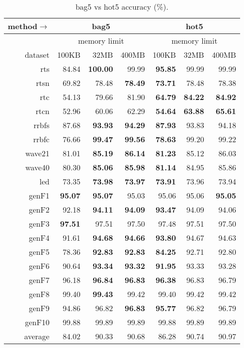 \begin{table}
\caption{{\sc bag5} vs {\sc hot5} accuracy (\%).}
\label{tab:bag5_vs_hot5_acc}
\centering
\begin{tabular}{|r||r|r|r||r|r|r|}
\hline
method$\rightarrow$ & \multicolumn{3}{|c||}{{\sc bag5}} & \multicolumn{3}{|c|}{{\sc hot5}} \\
\hline
 & \multicolumn{3}{|c||}{memory limit} & \multicolumn{3}{|c|}{memory limit} \\
\hline
dataset & 100KB & 32MB & 400MB & 100KB & 32MB & 400MB \\
\hline
{\sc rts} & 84.84 & \textbf{100.00} & 99.99 & \textbf{95.85} & 99.99 & 99.99 \\
{\sc rtsn} & 69.82 & 78.48 & \textbf{78.49} & \textbf{73.71} & 78.48 & 78.38 \\
{\sc rtc} & 54.13 & 79.66 & 81.90 & \textbf{64.79} & \textbf{84.22} & \textbf{84.92} \\
{\sc rtcn} & 52.96 & 60.06 & 62.29 & \textbf{54.64} & \textbf{63.88} & \textbf{65.61} \\
{\sc rrbfs} & 87.68 & \textbf{93.93} & \textbf{94.29} & \textbf{87.93} & 93.83 & 94.18 \\
{\sc rrbfc} & 76.66 & \textbf{99.47} & \textbf{99.56} & \textbf{78.63} & 99.20 & 99.22 \\
{\sc wave21} & 81.01 & \textbf{85.19} & \textbf{86.14} & \textbf{81.23} & 85.12 & 86.03 \\
{\sc wave40} & 80.30 & \textbf{85.06} & \textbf{85.98} & \textbf{81.14} & 84.95 & 85.86 \\
{\sc led} & 73.35 & \textbf{73.98} & \textbf{73.97} & \textbf{73.91} & 73.96 & 73.94 \\
{\sc genF1} & \textbf{95.07} & \textbf{95.07} & 95.03 & 95.06 & 95.06 & \textbf{95.05} \\
{\sc genF2} & 92.18 & \textbf{94.11} & \textbf{94.09} & \textbf{93.47} & 94.09 & 94.06 \\
{\sc genF3} & \textbf{97.51} & 97.51 & 97.50 & 97.48 & 97.51 & 97.50 \\
{\sc genF4} & 91.61 & \textbf{94.68} & \textbf{94.66} & \textbf{93.80} & 94.67 & 94.63 \\
{\sc genF5} & 78.36 & \textbf{92.83} & \textbf{92.83} & \textbf{84.25} & 92.71 & 92.80 \\
{\sc genF6} & 90.64 & \textbf{93.34} & \textbf{93.32} & \textbf{91.95} & 93.33 & 93.28 \\
{\sc genF7} & 96.18 & \textbf{96.84} & \textbf{96.83} & \textbf{96.38} & 96.83 & 96.79 \\
{\sc genF8} & 99.40 & \textbf{99.43} & 99.42 & 99.40 & 99.42 & 99.42 \\
{\sc genF9} & 94.86 & 96.82 & \textbf{96.83} & \textbf{95.77} & 96.82 & 96.79 \\
{\sc genF10} & 99.88 & 99.89 & 99.89 & 99.88 & 99.89 & 99.89 \\
\hline
average & 84.02 & 90.33 & 90.68 & 86.28 & 90.74 & 90.97 \\
\hline
\end{tabular}
\end{table}

